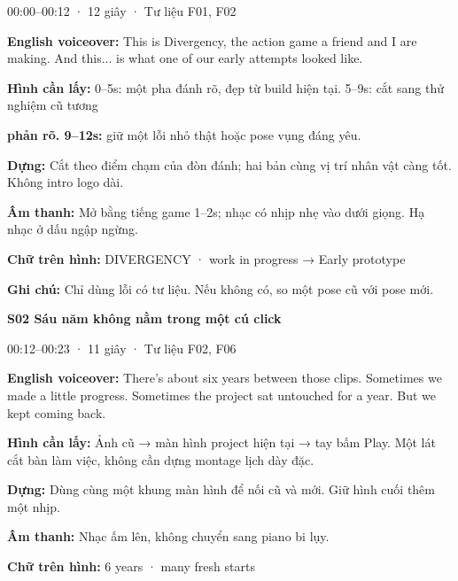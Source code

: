 \documentclass[10pt,a4paper]{article}
\begin{document}
00:00–00:12 · 12 giây · Tư liệu F01, F02\par

\textbf{English voiceover:}  This is Divergency, the action game a friend and I are making. And this... is what one of our early attempts looked like.\par

\textbf{Hình cần lấy:}  0–5s: một pha đánh rõ, đẹp từ build hiện tại. 5–9s: cắt sang thử nghiệm cũ tương\par

\textbf{phản rõ. 9–12s:}  giữ một lỗi nhỏ thật hoặc pose vụng đáng yêu.\par

\textbf{Dựng:}  Cắt theo điểm chạm của đòn đánh; hai bản cùng vị trí nhân vật càng tốt. Không intro logo dài.\par

\textbf{Âm thanh:}  Mở bằng tiếng game 1–2s; nhạc có nhịp nhẹ vào dưới giọng. Hạ nhạc ở dấu ngập ngừng.\par

\textbf{Chữ trên hình:}  DIVERGENCY · work in progress → Early prototype\par

\textbf{Ghi chú:}  Chỉ dùng lỗi có tư liệu. Nếu không có, so một pose cũ với pose mới.\par

\textbf{S02 Sáu năm không nằm trong một cú click}\par

00:12–00:23 · 11 giây · Tư liệu F02, F06\par

\textbf{English voiceover:}  There’s about six years between those clips. Sometimes we made a little progress. Sometimes the project sat untouched for a year. But we kept coming back.\par

\textbf{Hình cần lấy:}  Ảnh cũ → màn hình project hiện tại → tay bấm Play. Một lát cắt bàn làm việc, không cần dựng montage lịch dày đặc.\par

\textbf{Dựng:}  Dùng cùng một khung màn hình để nối cũ và mới. Giữ hình cuối thêm một nhịp.\par

\textbf{Âm thanh:}  Nhạc ấm lên, không chuyển sang piano bi lụy.\par

\textbf{Chữ trên hình:}  6 years · many fresh starts\par
\end{document}
